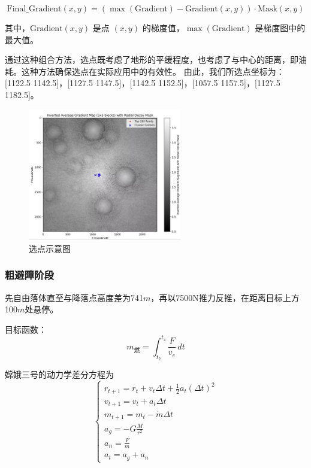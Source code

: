 \documentclass{ctexart}
\begin{document}
\[
\text{Final\_Gradient}(x, y) = (\max(\text{Gradient}) - \text{Gradient}(x, y)) \cdot \text{Mask}(x, y)
\]

其中，\(\text{Gradient}(x, y)\) 是点 \((x, y)\) 的梯度值，\(\max(\text{Gradient})\) 是梯度图中的最大值。

通过这种组合方法，选点既考虑了地形的平缓程度，也考虑了与中心的距离，即油耗。这种方法确保选点在实际应用中的有效性。
由此，我们所选点坐标为：[1122.5 1142.5]，[1127.5 1147.5]，[1142.5 1152.5]，[1057.5 1157.5]，[1127.5 1182.5]。

    \begin{figure}[H] %
        \centering %
        \includegraphics[width=0.6\textwidth]{"./picture/1.jpg"} %
        \caption{选点示意图} %
        \label{fig:example} %
    \end{figure}

\subsubsection{粗避障阶段}
先自由落体直至与降落点高度差为741\(m\)，再以7500N推力反推，在距离目标上方100\(m\)处悬停。

目标函数：
\begin{equation}
m_{\text{燃}} = \int_{t_2}^{t_4} \frac{F}{v_e} \, dt
\end{equation}

嫦娥三号的动力学差分方程为
\[
\begin{cases}
r_{t+1} = r_t + v_t \Delta t + \frac{1}{2} a_t (\Delta t)^2 \\
v_{t+1} = v_t + a_t \Delta t \\
m_{t+1} = m_t - \dot{m} \Delta t \\
a_g = - G \frac{M}{r^2} \\
a_n = \frac{F}{m} \\
a_t = a_g + a_n
\end{cases}
\]
\end{document}
